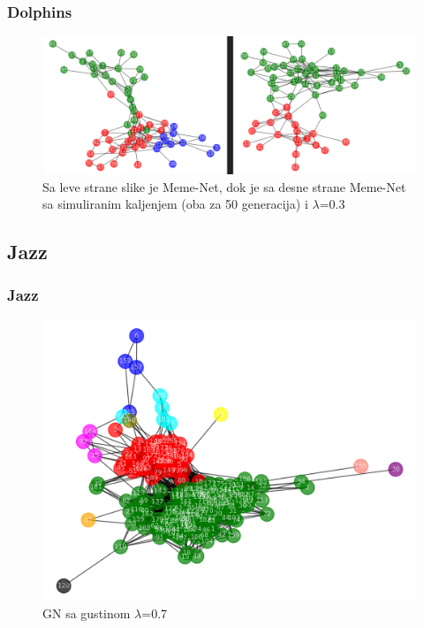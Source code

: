 \documentclass{beamer}
\begin{document}
\begin{frame}\frametitle{Dolphins}
\begin{figure}[h!]
\begin{center}
\includegraphics[scale=0.23]{MA_dolphin.png}
\end{center}
\caption{Sa leve strane slike je Meme-Net, dok je sa desne strane Meme-Net sa simuliranim kaljenjem (oba za 50 generacija) i $\lambda$=0.3}
\label{fig:Meme_dolp1}
\end{figure}
\end{frame}

\subsection{Jazz}
\begin{frame}\frametitle{Jazz}
\begin{figure}[h!]
\begin{center}
\includegraphics[scale=0.4]{Jazz_GN_0.7density.png}
\end{center}
\caption{GN sa gustinom $\lambda$=0.7}
\label{fig:Jazz_1}
\end{figure}
\end{frame}
\end{document}
